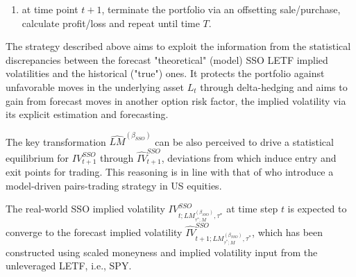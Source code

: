 \documentclass{rQUF2e}
\theoremstyle{plain}
\theoremstyle{definition}
\begin{document}
\begin{enumerate}
\begin{itemize}
			\item
			if $\widehat{IV}^{SSO}_{t+1; LM^{(\beta_{SSO})}_{\tau^*; M}, \tau^*} < IV^{SSO}_{t; LM^{(\beta_{SSO})}_{\tau^*; M}, \tau^*}$ for all $LM^{(\beta_{SSO})}_{\tau^*; M}$, then sell (short) options corresponding to the largest difference $D_{short} \stackrel{\operatorname{def}}{=} IV^{SSO}_{t; LM^{(\beta_{SSO})}_{\tau^*; M}, \tau^*} - \widehat{IV}^{SSO}_{t+1; LM^{(\beta_{SSO})}_{\tau^*; M}, \tau^*}$,
			\item
			if it holds that both $\widehat{IV}^{SSO}_{t+1; LM^{(\beta_{SSO})}_{\tau^*; M}, \tau^*} > IV^{SSO}_{t; LM^{(\beta_{SSO})}_{\tau^*; M}, \tau^*}$ and $\widehat{IV}^{SSO}_{t+1; LM^{(\beta_{SSO})}_{\tau^*; M}, \tau^*} < IV^{SSO}_{t; LM^{(\beta_{SSO})}_{\tau^*; M}, \tau^*}$ for different $LM^{(\beta_{SSO})}_{\tau^*; M}$, then buy (long) options with the largest $D_{long}$  and sell (short) options with the largest $D_{short}$. In all three cases use the underlying SSO LETF asset to make the portfolio delta-neutral,
		\end{itemize}
		\item
		at time point $t+1$, terminate the portfolio via an offsetting sale/purchase, calculate profit/loss and repeat until time $T$.
	\end{enumerate} 
	
	The strategy described above aims to exploit the information from the statistical discrepancies between the forecast "theoretical" (model) SSO LETF implied volatilities and the historical ("true") ones. It protects the portfolio against unfavorable moves in the underlying asset $L_t$ through delta-hedging and aims to gain from forecast moves in another option risk factor, the implied volatility via its explicit estimation and forecasting. 
	
	The key transformation $\widehat{LM}^{(\beta_{SSO})}$ can be also perceived to drive a statistical equilibrium for $IV^{SSO}_{t+1}$ through $\widehat{IV}^{SSO}_{t+1}$, deviations from which induce entry and exit points for trading. This reasoning is in line with that of \citet{avellaneda_lee} who introduce a model-driven pairs-trading strategy in US equities.
	
	The real-world SSO implied volatility $IV^{SSO}_{t; LM^{(\beta_{SSO})}_{\tau^*; M}, \tau^*}$ at time step $t$ is expected to converge to the forecast implied volatility $\widehat{IV}^{SSO}_{t+1; LM^{(\beta_{SSO})}_{\tau^*; M}, \tau^*}$, which has been constructed using scaled moneyness and implied volatility input from the unleveraged LETF, i.e., SPY.
	
\end{document}
